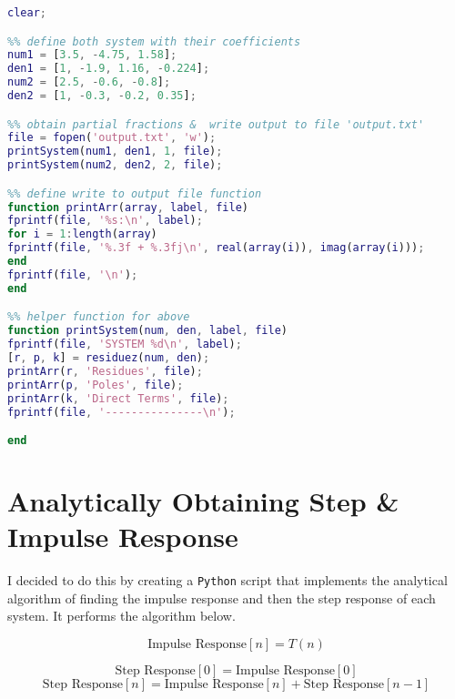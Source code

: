 \documentclass[]{report}
\newcommand{\python}{\texttt{Python} }
\begin{document}
\begin{lstlisting}[language=Matlab, frame=single]
%% ensure clear data
clear;

%% define both system with their coefficients
num1 = [3.5, -4.75, 1.58];
den1 = [1, -1.9, 1.16, -0.224];
num2 = [2.5, -0.6, -0.8];
den2 = [1, -0.3, -0.2, 0.35];

%% obtain partial fractions &  write output to file 'output.txt'
file = fopen('output.txt', 'w');
printSystem(num1, den1, 1, file);
printSystem(num2, den2, 2, file);

%% define write to output file function
function printArr(array, label, file)
fprintf(file, '%s:\n', label);
for i = 1:length(array)
fprintf(file, '%.3f + %.3fj\n', real(array(i)), imag(array(i)));
end
fprintf(file, '\n');
end

%% helper function for above
function printSystem(num, den, label, file)
fprintf(file, 'SYSTEM %d\n', label);
[r, p, k] = residuez(num, den);
printArr(r, 'Residues', file);
printArr(p, 'Poles', file);
printArr(k, 'Direct Terms', file);
fprintf(file, '---------------\n');

end
\end{lstlisting}

\newpage
\section*{Analytically Obtaining Step \& Impulse Response}
I decided to do this by creating a \python script that implements the analytical algorithm of finding the impulse response and then the step response of each system. It performs the algorithm below.

\[ \text{Impulse Response}[n] = T(n)	\]

\[ \text{Step Response}[0] = \text{Impulse Response}[0]	\]
\[ \text{Step Response}[n] = \text{Impulse Response}[n] +  \text{Step Response}[n-1]	\]
\end{document}

